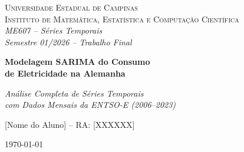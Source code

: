 \documentclass[12pt, a4paper]{article}
\begin{document}
\begin{titlepage}
  \centering
  \vspace*{1cm}

  {\large\scshape\color{azulescuro}
    Universidade Estadual de Campinas \\
    Instituto de Matemática, Estatística e Computação Científica}\\[0.3em]
  {\normalsize\itshape ME607 -- Séries Temporais}\\[0.2em]
  {\small\itshape Semestre 01/2026 -- Trabalho Final}

  \vspace{2.5cm}

  {\LARGE\bfseries\color{azulescuro}
    Modelagem SARIMA do Consumo\\[0.3em]
    de Eletricidade na Alemanha}

  \vspace{1cm}

  {\large\itshape
    Análise Completa de Séries Temporais\\[0.4em]
    com Dados Mensais da ENTSO-E (2006--2023)}

  \vspace{3cm}

  {\normalsize
    [Nome do Aluno] -- RA: [XXXXXX]
  }

  \vfill
  {\normalsize \today}
\end{titlepage}

\thispagestyle{fancy}

\begin{abstract}
\noindent
Este trabalho apresenta uma análise estatística completa da série mensal de consumo
total de eletricidade na Alemanha, disponibilizada pela \textit{European Network of
Transmission System Operators for Electricity} (ENTSO-E), cobrindo o período de
janeiro de 2006 a dezembro de 2023 (216 observações mensais). A série exibe tendência
decrescente suave, forte sazonalidade anual determinada pelo ciclo de aquecimento e
arrefecimento, e uma intervenção estrutural claramente identificável em 2020 associada
à pandemia de COVID-19. A metodologia de Box-Jenkins \cite{BoxTimeSeries} é seguida
sistematicamente nas etapas de análise exploratória, decomposição sazonal, testes de
estacionaridade, identificação, estimação e diagnóstico de modelos da classe
$\mathrm{SARIMA}(p,d,q)(P,D,Q)_{12}$. Toda a análise é conduzida em Python, utilizando
os pacotes \texttt{statsmodels}, \texttt{pmdarima}, \texttt{pandas},
\texttt{matplotlib} e \texttt{scipy}. Uma discussão crítica das vantagens, limitações
e extensões do modelo encerra o trabalho.
\end{abstract}
\end{document}
